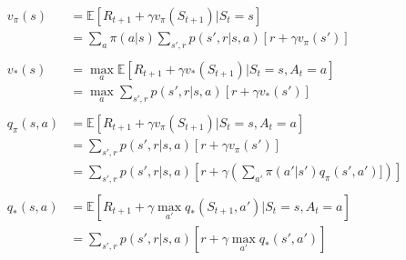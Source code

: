 \documentclass{article}
\begin{document}
\[
  \begin{aligned}
  v_{\pi}(s) &= \mathbb{E}[R_{t+1} + \gamma v_{\pi}(S_{t+1}) | S_{t}=s] \\
  &= \sum_{a}\pi(a|s) \sum_{s',r}p(s',r|s,a)[r + \gamma v_{\pi}(s')]\\
  \\
  v_{*}(s) &= \max_{a}\mathbb{E}[R_{t+1} + \gamma v_{*}(S_{t+1}) | S_{t}=s, A_{t}=a]\\
  &= \max_{a}\sum_{s',r}p(s',r|s,a)[r + \gamma v_{*}(s')]\\
  \\
  q_{\pi}(s,a) &= \mathbb{E}[R_{t+1} + \gamma v_{\pi}(S_{t+1}) | S_{t}=s, A_{t}=a]\\
  &= \sum_{s',r}p(s',r|s,a)[r + \gamma v_{\pi}(s')]\\
  &= \sum_{s',r}p(s',r|s,a)[r + \gamma (\sum_{a'}\pi(a'|s') q_{\pi}(s',a')])]\\
  \\
  q_{*}(s,a) &= \mathbb{E}[R_{t+1} + \gamma \max_{a'}q_{*}(S_{t+1}, a') | S_{t}=s, A_{t}=a]\\
  &= \sum_{s',r}p(s',r|s,a)[r + \gamma \max_{a'}q_{*}(s', a')]
  \end{aligned}
\]
\end{document}
